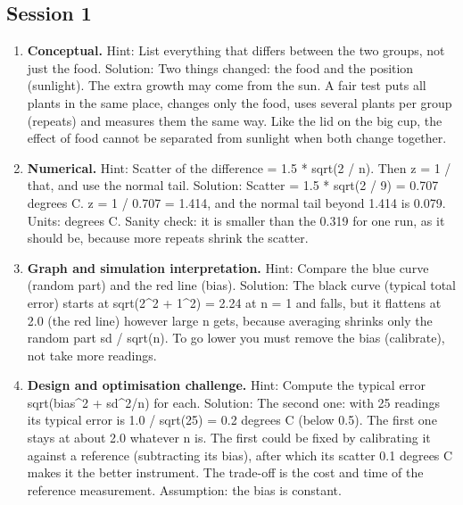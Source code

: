 \documentclass[11pt,a4paper]{article}
\begin{document}
\subsection*{Session 1}
\begin{enumerate}[nosep]
\item \textbf{Conceptual.} Hint: List everything that differs between the two groups, not just the food. Solution: Two things changed: the food and the position (sunlight). The extra growth may come from the sun. A fair test puts all plants in the same place, changes only the food, uses several plants per group (repeats) and measures them the same way. Like the lid on the big cup, the effect of food cannot be separated from sunlight when both change together.
\item \textbf{Numerical.} Hint: Scatter of the difference = 1.5 * sqrt(2 / n). Then z = 1 / that, and use the normal tail. Solution: Scatter = 1.5 * sqrt(2 / 9) = 0.707 degrees C. z = 1 / 0.707 = 1.414, and the normal tail beyond 1.414 is 0.079. Units: degrees C. Sanity check: it is smaller than the 0.319 for one run, as it should be, because more repeats shrink the scatter.
\item \textbf{Graph and simulation interpretation.} Hint: Compare the blue curve (random part) and the red line (bias). Solution: The black curve (typical total error) starts at sqrt(2\textasciicircum{}2 + 1\textasciicircum{}2) = 2.24 at n = 1 and falls, but it flattens at 2.0 (the red line) however large n gets, because averaging shrinks only the random part sd / sqrt(n). To go lower you must remove the bias (calibrate), not take more readings.
\item \textbf{Design and optimisation challenge.} Hint: Compute the typical error sqrt(bias\textasciicircum{}2 + sd\textasciicircum{}2/n) for each. Solution: The second one: with 25 readings its typical error is 1.0 / sqrt(25) = 0.2 degrees C (below 0.5). The first one stays at about 2.0 whatever n is. The first could be fixed by calibrating it against a reference (subtracting its bias), after which its scatter 0.1 degrees C makes it the better instrument. The trade-off is the cost and time of the reference measurement. Assumption: the bias is constant.
\end{enumerate}
\end{document}
